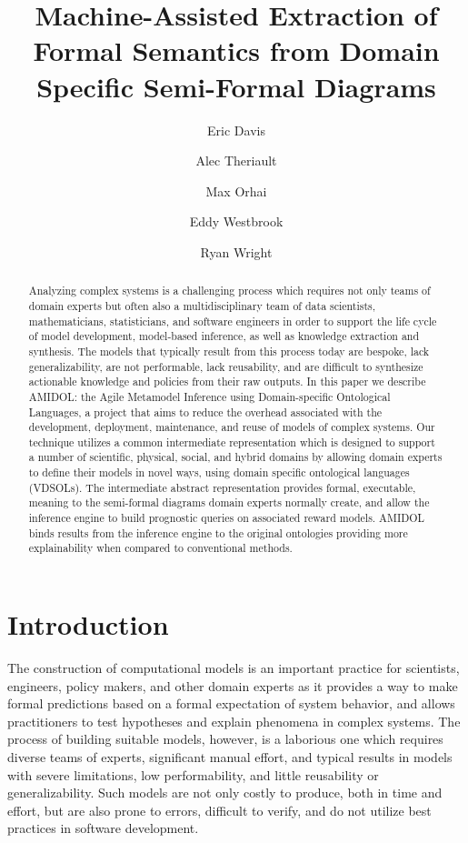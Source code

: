 \documentclass[11pt]{article}
\date{\vspace{-5ex}}
\author[1]{Eric Davis}
\author[1]{Alec Theriault}
\author[1]{Max Orhai}
\author[1]{Eddy Westbrook}
\author[1]{Ryan Wright}
\affil[1]{Galois, Inc}
\title{Machine-Assisted Extraction of Formal Semantics from Domain Specific Semi-Formal Diagrams}
\newcommand{\amidol}{\textsc{AMIDOL}}
\begin{document}
\maketitle
\vspace{10pt}
\begin{abstract}
Analyzing complex systems is a challenging process which requires not only teams of domain experts but often also a multidisciplinary team of data scientists, mathematicians, statisticians, and software engineers in order to support the life cycle of model development, model-based inference, as well as knowledge extraction and synthesis.  The models that typically result from this process today are bespoke, lack generalizability, are not performable, lack reusability, and are difficult to synthesize actionable knowledge and policies from their raw outputs.  In this paper we describe \amidol{}: the Agile Metamodel Inference using Domain-specific Ontological Languages, a project that aims to reduce the overhead associated with the development, deployment, maintenance, and reuse of models of complex systems.  Our technique utilizes a common intermediate representation which is designed to support a number of scientific, physical, social, and hybrid domains by allowing domain experts to define their models in novel ways, using domain specific ontological languages (VDSOLs).  The intermediate abstract representation provides formal, executable, meaning to the semi-formal diagrams domain experts normally create, and allow the inference engine to build prognostic queries on associated reward models.  \amidol{} binds results from the inference engine to the original ontologies providing more explainability when compared to conventional methods.
\end{abstract}

\section{Introduction}

The construction of computational models is an important practice for scientists, engineers, policy makers, and other domain experts as it provides a way to make formal predictions based on a formal expectation of system behavior, and allows practitioners to test hypotheses and explain phenomena in complex systems.  The process of building suitable models, however, is a laborious one which requires diverse teams of experts, significant manual effort, and typical results in models with severe limitations, low performability, and little reusability or generalizability.  Such models are not only costly to produce, both in time and effort, but are also prone to errors, difficult to verify, and do not utilize best practices in software development.
\end{document}
